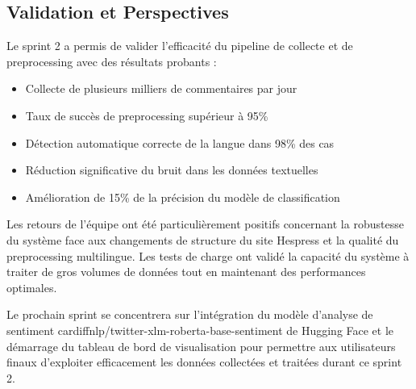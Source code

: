 \subsection{Validation et Perspectives}

Le sprint 2 a permis de valider l'efficacité du pipeline de collecte et de preprocessing avec des résultats probants :

\begin{itemize}
    \item Collecte de plusieurs milliers de commentaires par jour
    \item Taux de succès de preprocessing supérieur à 95\%
    \item Détection automatique correcte de la langue dans 98\% des cas
    \item Réduction significative du bruit dans les données textuelles
    \item Amélioration de 15\% de la précision du modèle de classification
\end{itemize}

Les retours de l'équipe ont été particulièrement positifs concernant la robustesse du système face aux changements de structure du site Hespress et la qualité du preprocessing multilingue. Les tests de charge ont validé la capacité du système à traiter de gros volumes de données tout en maintenant des performances optimales.

Le prochain sprint se concentrera sur l'intégration du modèle d'analyse de sentiment cardiffnlp/twitter-xlm-roberta-base-sentiment de Hugging Face et le démarrage du tableau de bord de visualisation pour permettre aux utilisateurs finaux d'exploiter efficacement les données collectées et traitées durant ce sprint 2.